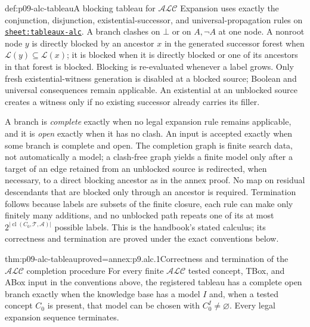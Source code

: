\begin{hbmethod}{def:p09-alc-tableau}{A blocking tableau for \(\mathcal{ALC}\)}
Expansion uses exactly the conjunction, disjunction, existential-successor,
and universal-propagation rules on
\hyperref[sheet:tableaux-alc]{\texttt{sheet:tableaux-alc}}.  A branch clashes
on \(\bot\) or on \(A,\neg A\) at one node.  A nonroot node \(y\) is directly
blocked by an ancestor \(x\) in the generated successor forest when
\(\mathcal L(y)\subseteq\mathcal L(x)\); it is blocked when it is directly
blocked or one of its ancestors in that forest is blocked.  Blocking is
re-evaluated whenever
a label grows.  Only fresh existential-witness generation is disabled at a
blocked source; Boolean and universal consequences remain applicable.
An existential at an unblocked source creates a witness only if no existing
successor already carries its filler.

A branch is \emph{complete} exactly when no legal expansion rule remains
applicable, and it is \emph{open} exactly when it has no clash.  An input is
accepted exactly when some branch is complete and open.  The completion graph
is finite search data, not automatically a
model; a clash-free graph yields a finite model only after a target of an edge
retained from an unblocked source is redirected, when necessary, to a direct
blocking ancestor as in the annex proof.  No map on residual descendants that
are blocked only through an ancestor is required.  Termination
follows because labels are subsets of the finite closure, each rule can make
only finitely many additions, and no unblocked path repeats one of its at most
\(2^{|\operatorname{cl}(C_0,\mathcal T,\mathcal A)|}\) possible labels.  This
is the handbook's stated calculus; its correctness and termination are proved
under the exact conventions below.
\end{hbmethod}

\begin{hbtheorem}{thm:p09-alc-tableau}{proved=annex:p9.alc.1}{Correctness and termination of the \(\mathcal{ALC}\) completion procedure}
For every finite \(\mathcal{ALC}\) tested concept, TBox, and ABox input in the
conventions above, the registered tableau has a complete open branch exactly
when the knowledge base has a model \(I\) and, when a tested concept \(C_0\) is
present, that model can be chosen with \(C_0^I\ne\varnothing\).
Every legal expansion sequence terminates.
\end{hbtheorem}



